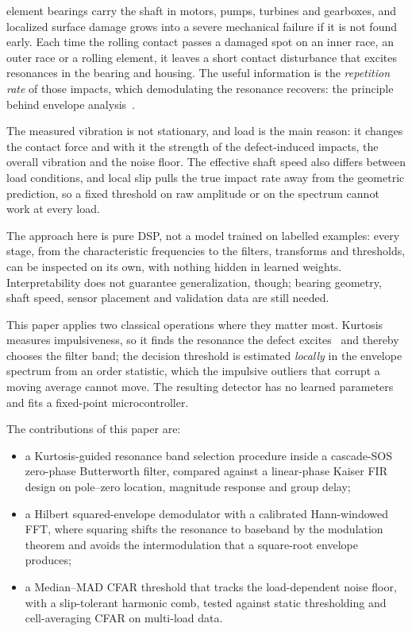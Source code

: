  element bearings carry the shaft in motors, pumps,
turbines and gearboxes, and localized surface damage grows into a severe
mechanical failure if it is not found early. Each time the rolling contact
passes a damaged spot on an inner race, an outer race or a rolling element, it
leaves a short contact disturbance that excites resonances in the bearing and
housing. The useful information is the \emph{repetition rate} of those impacts,
which demodulating the resonance recovers: the principle behind envelope
analysis~\cite{randall2011,kim2020}.

The measured vibration is not stationary, and load is the main reason: it
changes the contact force and with it the strength of the defect-induced
impacts, the overall vibration and the noise floor. The effective shaft speed
also differs between load conditions, and local slip pulls the true impact rate
away from the geometric prediction, so a fixed threshold on raw amplitude or on
the spectrum cannot work at every load.

The approach here is pure DSP, not a model trained on labelled examples: every
stage, from the characteristic frequencies to the filters, transforms and
thresholds, can be inspected on its own, with nothing hidden in learned weights.
Interpretability does not guarantee generalization, though; bearing geometry,
shaft speed, sensor placement and validation data are still needed.

This paper applies two classical operations where they matter most. Kurtosis
measures impulsiveness, so it finds the resonance the defect
excites~\cite{antoni2007} and thereby chooses the filter band; the decision
threshold is estimated \emph{locally} in the envelope spectrum from an order
statistic, which the impulsive outliers that corrupt a moving average cannot
move. The resulting detector has no learned parameters and fits a fixed-point
microcontroller.

The contributions of this paper are:
\begin{itemize}
  \item a Kurtosis-guided resonance band selection procedure inside a
        cascade-SOS zero-phase Butterworth filter, compared against a
        linear-phase Kaiser FIR design on pole--zero location, magnitude
        response and group delay;
  \item a Hilbert squared-envelope demodulator with a calibrated Hann-windowed
        FFT, where squaring shifts the resonance to baseband by the modulation
        theorem and avoids the intermodulation that a square-root envelope
        produces;
  \item a Median--MAD CFAR threshold that tracks the load-dependent noise
        floor, with a slip-tolerant harmonic comb, tested against static
        thresholding and cell-averaging CFAR on multi-load data.
\end{itemize}

